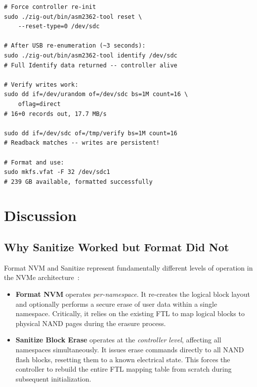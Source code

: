 \documentclass[conference]{IEEEtran}
\begin{document}
\begin{lstlisting}[style=shell,caption={Post-sanitize reset and
write verification.},label={lst:verify}]
# Force controller re-init
sudo ./zig-out/bin/asm2362-tool reset \
    --reset-type=0 /dev/sdc

# After USB re-enumeration (~3 seconds):
sudo ./zig-out/bin/asm2362-tool identify /dev/sdc
# Full Identify data returned -- controller alive

# Verify writes work:
sudo dd if=/dev/urandom of=/dev/sdc bs=1M count=16 \
    oflag=direct
# 16+0 records out, 17.7 MB/s

sudo dd if=/dev/sdc of=/tmp/verify bs=1M count=16
# Readback matches -- writes are persistent!

# Format and use:
sudo mkfs.vfat -F 32 /dev/sdc1
# 239 GB available, formatted successfully
\end{lstlisting}


\section{Discussion}
\label{sec:discussion}

\subsection{Why Sanitize Worked but Format Did Not}
\label{sec:sanitize-vs-format}

Format NVM and Sanitize represent fundamentally different levels of
operation in the NVMe architecture~\cite{nvme-spec-2.0}:

\begin{itemize}
\item \textbf{Format NVM} operates \emph{per-namespace}. It re-creates
  the logical block layout and optionally performs a secure erase of
  user data within a single namespace. Critically, it relies on the
  existing FTL to map logical blocks to physical NAND pages during the
  erasure process.

\item \textbf{Sanitize Block Erase} operates at the \emph{controller
  level}, affecting all namespaces simultaneously. It issues erase
  commands directly to all NAND flash blocks, resetting them to a known
  electrical state. This forces the controller to rebuild the entire FTL
  mapping table from scratch during subsequent initialization.
\end{itemize}
\end{document}
